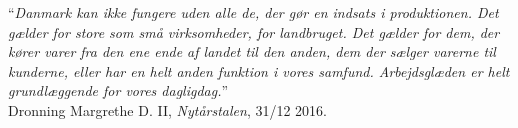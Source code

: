 












\newcommand{\DefineRemark}[2]{%
  \expandafter\newcommand\csname rmk-#1\endcsname{#2}%
}
\newcommand{\emak}[1]{\csname rmk-#1\endcsname}






%
%









\newpage 
\begin{center}
\vspace*{2in}
“\emph{Danmark kan ikke fungere uden alle de, der gør en indsats i produktionen. Det gælder for store som små virksomheder, for landbruget. Det gælder for dem, der kører varer fra	den ene ende af landet til den anden, dem der sælger varerne til kunderne, eller har en helt anden funktion i vores samfund. Arbejdsglæden er helt grundlæggende for vores dagligdag.}” \\

\vspace{1cm}
\hfill Dronning Margrethe D. II, \emph{Nytårstalen}, 31/12 2016.
\end{center}
\newpage 

